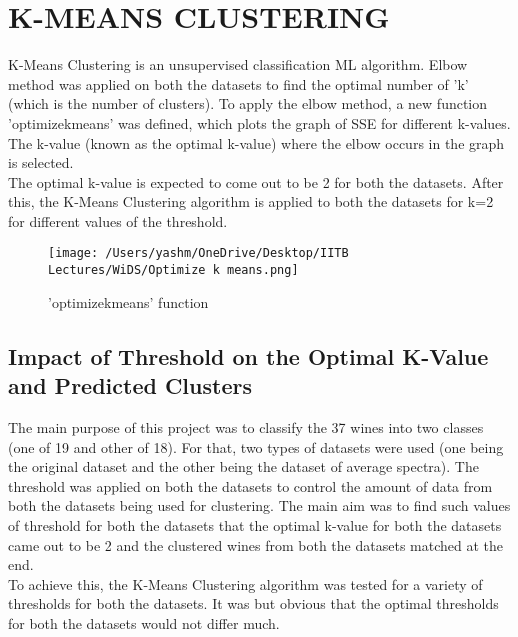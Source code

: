 \documentclass{article}
\begin{document}
\section{K-MEANS CLUSTERING}
K-Means Clustering is an unsupervised classification ML algorithm. Elbow method was applied on both the datasets to find the optimal number of 'k' (which is the number of clusters). To apply the elbow method, a new function 'optimize\textunderscore k\textunderscore means' was defined, which plots the graph of SSE for different k-values. The k-value (known as the optimal k-value) where the elbow occurs in the graph is selected. \\
\newline
The optimal k-value is expected to come out to be 2 for both the datasets. After this, the K-Means Clustering algorithm is applied to both the datasets for k=2 for different values of the threshold.\\
\begin{figure}[H]
	\centering
	\texttt{[image: /Users/yashm/OneDrive/Desktop/IITB Lectures/WiDS/Optimize k means.png]}
	\caption[Optional Caption]{'optimize\textunderscore k\textunderscore means' function} 
	\label{fig:fig5}
\end{figure}
\subsection{Impact of Threshold on the Optimal K-Value and Predicted Clusters}
The main purpose of this project was to classify the 37 wines into two classes (one of 19 and other of 18). For that, two types of datasets were used (one being the original dataset and the other being the dataset of average spectra). The threshold was applied on both the datasets to control the amount of data from both the datasets being used for clustering. The main aim was to find such values of threshold for both the datasets that the optimal k-value for both the datasets came out to be 2 and the clustered wines from both the datasets matched at the end. \\
\newline
To achieve this, the K-Means Clustering algorithm was tested for a variety of thresholds for both the datasets. It was but obvious that the optimal thresholds for both the datasets would not differ much.\\
\end{document}
